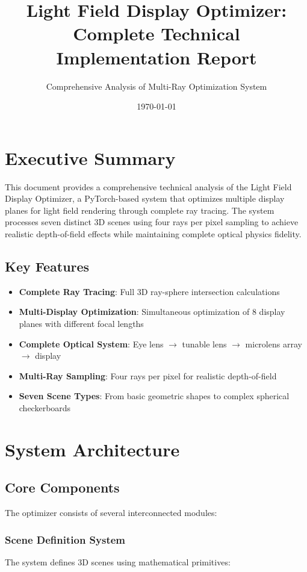 \documentclass[12pt,a4paper]{article}
\title{\textbf{Light Field Display Optimizer:\\Complete Technical Implementation Report}}
\author{Comprehensive Analysis of Multi-Ray Optimization System}
\date{\today}
\begin{document}
\maketitle

\tableofcontents
\newpage

\section{Executive Summary}

This document provides a comprehensive technical analysis of the Light Field Display Optimizer, a PyTorch-based system that optimizes multiple display planes for light field rendering through complete ray tracing. The system processes seven distinct 3D scenes using four rays per pixel sampling to achieve realistic depth-of-field effects while maintaining complete optical physics fidelity.

\subsection{Key Features}
\begin{itemize}
    \item \textbf{Complete Ray Tracing}: Full 3D ray-sphere intersection calculations
    \item \textbf{Multi-Display Optimization}: Simultaneous optimization of 8 display planes with different focal lengths
    \item \textbf{Complete Optical System}: Eye lens $\rightarrow$ tunable lens $\rightarrow$ microlens array $\rightarrow$ display
    \item \textbf{Multi-Ray Sampling}: Four rays per pixel for realistic depth-of-field
    \item \textbf{Seven Scene Types}: From basic geometric shapes to complex spherical checkerboards
\end{itemize}

\section{System Architecture}

\subsection{Core Components}

The optimizer consists of several interconnected modules:

\subsubsection{Scene Definition System}
The system defines 3D scenes using mathematical primitives:
\end{document}
